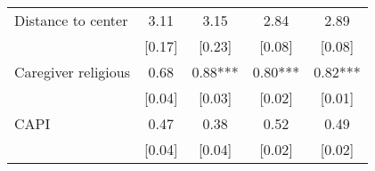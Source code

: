 \begin{table}[H]
\begin{adjustbox}{max height=\dimexpr\textheight-5.5cm\relax,max width=\textwidth}
\begin{tabular}{l cccc}
Distance to center   &   3.11   &   3.15   &   2.84   &   2.89 \\ 
   &   [0.17]   &   [0.23]   &   [0.08]   &   [0.08] \\ 
Caregiver religious   &   0.68   &   0.88***   &   0.80***   &   0.82*** \\ 
   &   [0.04]   &   [0.03]   &   [0.02]   &   [0.01] \\ 
CAPI   &   0.47   &   0.38   &   0.52   &   0.49 \\ 
   &   [0.04]   &   [0.04]   &   [0.02]   &   [0.02] \\ 
\hline 
\end{tabular}
\end{adjustbox}

\end{table}
